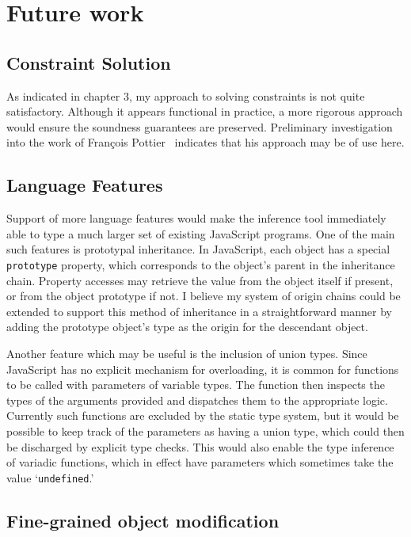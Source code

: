 \documentclass[12pt,a4paper,twoside,openright]{report}
\theoremstyle{definition}
\theoremstyle{dotless}
\newcommand*{\js}{\texttt}
\begin{document}
\section{Future work}

\subsection{Constraint Solution}
As indicated in chapter 3, my approach to solving constraints is not quite satisfactory. 
Although it appears functional in practice, a more rigorous approach would ensure the
soundness guarantees are preserved. Preliminary investigation into the work of
Fran\c{c}ois Pottier~\cite{pottier1998type} indicates that his approach may be of use here.

\subsection{Language Features}

Support of more language features would make the inference tool immediately
able to type a much larger set of existing JavaScript programs. One of the main
such features is prototypal inheritance. In JavaScript, each object has a
special \js{prototype} property, which corresponds to the object's parent in
the inheritance chain. Property accesses may retrieve the value from the
object itself if present, or from the object prototype if not. I believe my 
system of origin chains could be extended to support this method of inheritance 
in a straightforward manner by adding the prototype object's type as the origin
for the descendant object.

Another feature which may be useful is the inclusion of union types.
Since JavaScript has no explicit mechanism for overloading, it is common for
functions to be called with parameters of variable types. The function then
inspects the types of the arguments provided and dispatches them to the
appropriate logic. Currently such functions are excluded by the
static type system, but it would be possible to keep track of the parameters
as having a union type, which could then be discharged by explicit type checks.
This would also enable the type inference of variadic functions, which in effect
have parameters which sometimes take the value `\js{undefined}.'

\subsection{Fine-grained object modification}
\end{document}
